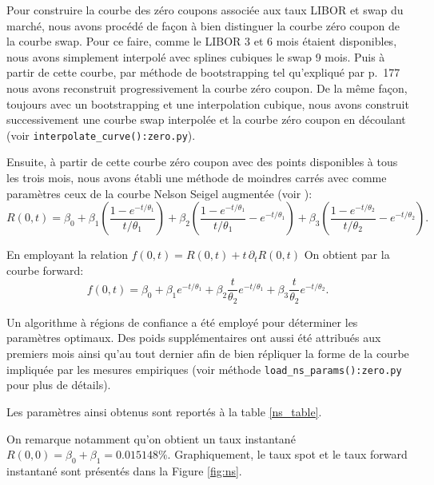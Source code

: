 Pour construire la courbe des zéro coupons associée aux taux LIBOR et swap du marché, nous
avons procédé de façon à bien distinguer la courbe zéro coupon de la courbe swap. Pour ce
faire, comme le LIBOR 3 et 6 mois étaient disponibles, nous avons simplement interpolé
avec splines cubiques le swap 9 mois. Puis à partir de cette courbe, par méthode de
bootstrapping tel qu'expliqué par \cite{veronesi} p.~177 nous avons reconstruit
progressivement la courbe zéro coupon. De la même façon, toujours avec un bootstrapping et
une interpolation cubique, nous avons construit successivement une courbe swap interpolée
et la courbe zéro coupon en découlant (voir \verb+interpolate_curve():zero.py+).

Ensuite, à partir de cette courbe zéro coupon avec des points disponibles à tous les trois
mois, nous avons établi une méthode de moindres carrés avec comme paramètres ceux de la
courbe Nelson Seigel augmentée (voir \cite{diebold}):
\[
  R(0,t) = \beta_0 + \beta_1\left(\frac{1-e^{-t/\theta_1}}{t/\theta_1}\right) +
  \beta_2\left(\frac{1-e^{-t/\theta_1}}{t/\theta_1} - e^{-t/\theta_1}\right) +
  \beta_3\left(\frac{1-e^{-t/\theta_2}}{t/\theta_2} - e^{-t/\theta_2}\right).
\]

En employant la relation $f(0,t) = R(0,t) + t\,\partial_tR(0,t)$ On obtient par la courbe
forward:
\[
  f(0,t) = \beta_0 + \beta_1 e^{-t/\theta_1} + \beta_2\frac{t}{\theta_2}e^{-t/\theta_1} +
  \beta_3\frac{t}{\theta_2}e^{-t/\theta_2}.
\]

Un algorithme à régions de confiance \cite{conn2000trust} a été employé pour déterminer
les paramètres optimaux. Des poids supplémentaires ont aussi été attribués aux premiers
mois ainsi qu'au tout dernier afin de bien répliquer la forme de la courbe impliquée par
les mesures empiriques (voir méthode \verb+load_ns_params():zero.py+ pour plus de
détails).

Les paramètres ainsi obtenus sont reportés à la table \ref{ns_table}.
\begin{table}
  \centering
  \caption{}
  \label{ns_table}
  
\end{table}


On remarque notamment qu'on obtient un taux instantané
$R(0,0) = \beta_0+\beta_1 = \num{0.015148}\%$. Graphiquement, le taux spot et le
taux forward instantané sont présentés dans la Figure \ref{fig:ns}.

